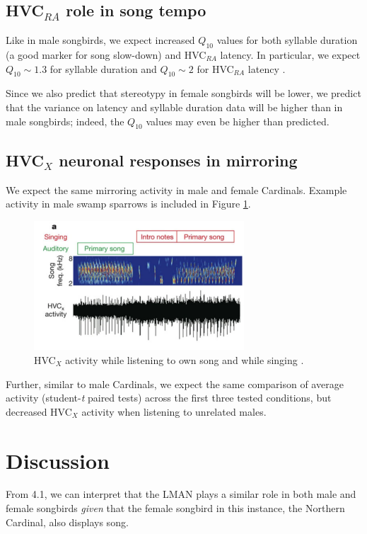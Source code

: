 \documentclass[12pt]{article}
\begin{document}
\subsection{HVC$_{RA}$ role in song tempo}
Like in male songbirds, we expect increased $Q_{10}$ values for both syllable duration (a good marker for song slow-down) and HVC$_{RA}$ latency. In particular, we expect $Q_{10} \sim 1.3$ for syllable duration and $Q_{10} \sim 2$ for HVC$_{RA}$ latency \cite{Hamaguchi}. 

Since we also predict that stereotypy in female songbirds will be lower, we predict that the variance on latency and syllable duration data will be higher than in male songbirds; indeed, the $Q_{10}$ values may even be higher than predicted.

\subsection{HVC$_X$ neuronal responses in mirroring}
We expect the same mirroring activity in male and female Cardinals. Example activity in male swamp sparrows is included in Figure \ref{fig:hvc_results}. 

\begin{figure}[ht]
\centering
\includegraphics[width=0.7\textwidth]{hvc_results.png}
\caption{\label{fig:hvc_results}HVC$_X$ activity while listening to own song and while singing \cite{Prather}.}
\end{figure}

Further, similar to male Cardinals, we expect the same comparison of average activity (student-\textit{t} paired tests) across the first three tested conditions, but decreased HVC$_X$ activity when listening to unrelated males.

\section{Discussion}
From 4.1, we can interpret that the LMAN plays a similar role in both male and female songbirds \textit{given} that the female songbird in this instance, the Northern Cardinal, also displays song.
\end{document}
